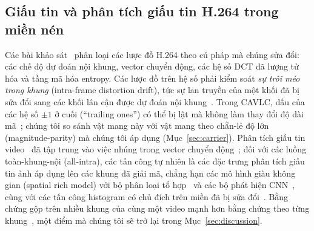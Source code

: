 \documentclass[journal]{IEEEtran}
\begin{document}
\subsection{Giấu tin và phân tích giấu tin H.264 trong miền nén}
Các bài khảo sát~\cite{ref:liu19review,ref:kunhoth23,ref:mstafa16} phân loại
các lược đồ H.264 theo cú pháp mà chúng sửa đổi: các chế độ dự đoán nội khung,
vector chuyển động, các hệ số DCT đã lượng tử hóa và tầng mã hóa entropy. Các
lược đồ trên hệ số phải kiểm soát \emph{sự trôi méo trong khung} (intra-frame
distortion drift), tức sự lan truyền của một khối đã bị sửa đổi sang các khối
lân cận được dự đoán nội khung~\cite{ref:ma10}. Trong CAVLC, dấu của các hệ số
$\pm1$ ở cuối (``trailing ones'') có thể bị lật mà không làm thay đổi độ dài
mã~\cite{ref:liao12}; chúng tôi so sánh vật mang này với vật mang theo chẵn-lẻ
độ lớn (magnitude-parity) mà chúng tôi áp dụng (Mục~\ref{sec:carrier}). Phân
tích giấu tin video~\cite{ref:bouzegza22} đã tập trung vào việc nhúng trong
vector chuyển động~\cite{ref:wang14mv}; đối với các luồng toàn-khung-nội
(all-intra), các tấn công tự nhiên là các đặc trưng phân tích giấu tin ảnh áp
dụng lên các khung đã giải mã, chẳng hạn các mô hình giàu không gian (spatial
rich model) với bộ phân loại tổ hợp~\cite{ref:srm,ref:ensemble} và các bộ phát
hiện CNN~\cite{ref:srnet}, cùng với các tấn công histogram có chủ đích trên miền
đã bị sửa đổi~\cite{ref:westfeld,ref:spa}. Bằng chứng gộp trên nhiều khung của
cùng một video mạnh hơn bằng chứng theo từng khung~\cite{ref:ker06}, một điểm mà
chúng tôi sẽ trở lại trong Mục~\ref{sec:discussion}.
\end{document}
